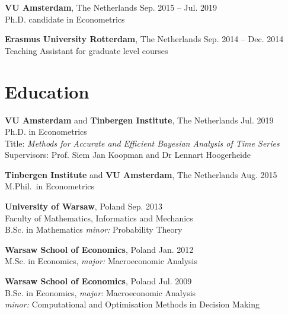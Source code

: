 \documentclass[margin,line]{resume}
\begin{document}
\begin{resume}
    \textbf{VU Amsterdam},  The Netherlands \hfill Sep. 2015 -- Jul. 2019\\
	Ph.D. candidate in Econometrics  
    \vspace{-2mm}
    
    \textbf{Erasmus University Rotterdam},  The Netherlands \hfill Sep. 2014 -- Dec. 2014\\
	Teaching Assistant for graduate level courses\\ 
	
\vspace{-5mm}    
    \section{\mysidestyle Education}
    \textbf{VU Amsterdam} and \textbf{Tinbergen Institute},  The Netherlands \hfill Jul. 2019\\
	Ph.D. in Econometrics\\
	Title: \textit{Methods for Accurate and Efficient Bayesian Analysis of Time Series}\\ 
    Supervisors: Prof. Siem Jan Koopman and Dr Lennart Hoogerheide
\vspace{-2mm}

    \textbf{Tinbergen Institute} and \textbf{VU Amsterdam}, The Netherlands  \hfill Aug. 2015 	\\
	M.Phil.\ in Econometrics
	\vspace{-2mm}

	\textbf{University of Warsaw}, Poland  \hfill Sep. 2013 	\\
	Faculty of Mathematics, Informatics and Mechanics \\B.Sc. in Mathematics		\textit{minor:} Probability Theory 
\vspace{-2mm}

	\textbf{Warsaw School of Economics}, Poland   \hfill  Jan. 2012\\
	M.Sc. in Economics, \textit{major:} Macroeconomic Analysis
\vspace{-2mm}

 	\textbf{Warsaw School of Economics}, Poland  \hfill  Jul. 2009\\
   	B.Sc. in Economics, \textit{major:} Macroeconomic Analysis\\ 
    \textit{minor:} Computational and Optimisation Methods in Decision Making\\


\end{resume}
\end{document}
